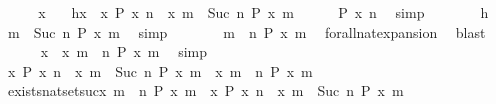 \begin{isabellebody}
\isanewline
{}\isamarkupfalse%
\isanewline
\ \ \isacommand{{\isacharbraceleft}}\isamarkupfalse%
\ \isamarkupfalse%
\ x\ \ \isamarkupfalse%
\ h{\isacharcolon}{\isacartoucheopen}x\ {\isasymin}\ {\isacharbraceleft}x{\isachardot}\ P\ x\ n{\isacharbraceright}\ {\isasyminter}\ {\isacharbraceleft}x{\isachardot}\ {\isasymforall}m\ {\isasymge}\ Suc\ n{\isachardot}\ P\ x\ m{\isacharbraceright}{\isacartoucheclose}\isanewline
\ \ \ \ \isamarkupfalse%
\ {\isacartoucheopen}P\ x\ n{\isacartoucheclose}\ \isamarkupfalse%
\ simp\isanewline
\ \ \ \ \isamarkupfalse%
\ \isamarkupfalse%
\ h\ \isamarkupfalse%
\ {\isacartoucheopen}{\isasymforall}m\ {\isasymge}\ Suc\ n{\isachardot}\ P\ x\ m{\isacartoucheclose}\ \isamarkupfalse%
\ simp\isanewline
\ \ \ \ \isamarkupfalse%
\ \isamarkupfalse%
\ {\isacartoucheopen}{\isasymforall}m\ {\isasymge}\ n{\isachardot}\ P\ x\ m{\isacartoucheclose}\ \isamarkupfalse%
\ forall{\isacharunderscore}nat{\isacharunderscore}expansion\ \isamarkupfalse%
\ blast\isanewline
\ \ \ \ \isamarkupfalse%
\ {\isacartoucheopen}x\ {\isasymin}\ {\isacharbraceleft}x{\isachardot}\ {\isasymforall}m\ {\isasymge}\ n{\isachardot}\ P\ x\ m{\isacharbraceright}{\isacartoucheclose}\ \isamarkupfalse%
\ simp\isanewline
\ \ \isacommand{{\isacharbraceright}}\isamarkupfalse%
\ \isamarkupfalse%
\ {\isacartoucheopen}{\isacharbraceleft}x{\isachardot}\ P\ x\ n{\isacharbraceright}\ {\isasyminter}\ {\isacharbraceleft}x{\isachardot}\ {\isasymforall}m\ {\isasymge}\ Suc\ n{\isachardot}\ P\ x\ m{\isacharbraceright}\ {\isasymsubseteq}\ {\isacharbraceleft}x{\isachardot}\ {\isasymforall}m\ {\isasymge}\ n{\isachardot}\ P\ x\ m{\isacharbraceright}{\isacartoucheclose}\ \isacommand{{\isachardot}{\isachardot}}\isamarkupfalse%
\isanewline
{}\isamarkupfalse%
%
\endisatagproof
{\isafoldproof}%
%
\isadelimproof
\isanewline
%
\endisadelimproof
\isanewline
{}\isamarkupfalse%
\ exists{\isacharunderscore}nat{\isacharunderscore}set{\isacharunderscore}suc{\isacharcolon}{\isacartoucheopen}{\isacharbraceleft}x{\isachardot}\ {\isasymexists}m\ {\isasymge}\ n{\isachardot}\ P\ x\ m{\isacharbraceright}\ {\isacharequal}\ {\isacharbraceleft}x{\isachardot}\ P\ x\ n{\isacharbraceright}\ {\isasymunion}\ {\isacharbraceleft}x{\isachardot}\ {\isasymexists}m\ {\isasymge}\ Suc\ n{\isachardot}\ P\ x\ m{\isacharbraceright}{\isacartoucheclose}\isanewline

\end{isabellebody}
